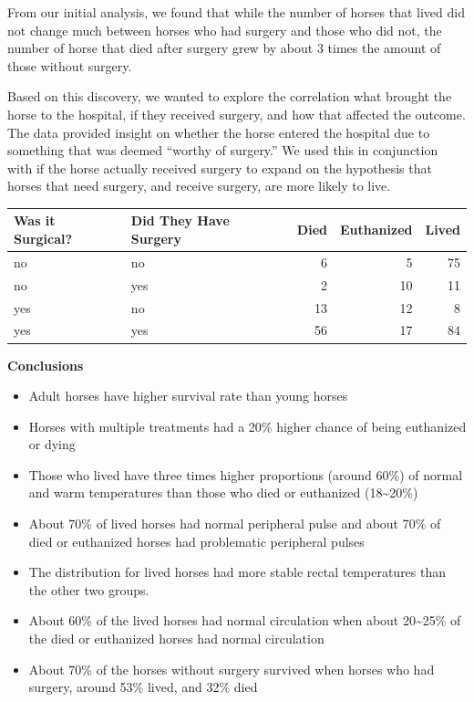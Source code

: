 \documentclass[
  12pt,
]{article}
\providecommand{\tightlist}{%
  \setlength{\itemsep}{0pt}\setlength{\parskip}{0pt}}
\begin{document}
From our initial analysis, we found that while the number of horses that
lived did not change much between horses who had surgery and those who
did not, the number of horse that died after surgery grew by about 3
times the amount of those without surgery.

Based on this discovery, we wanted to explore the correlation what
brought the horse to the hospital, if they received surgery, and how
that affected the outcome. The data provided insight on whether the
horse entered the hospital due to something that was deemed ``worthy of
surgery.'' We used this in conjunction with if the horse actually
received surgery to expand on the hypothesis that horses that need
surgery, and receive surgery, are more likely to live.

\begin{longtable}[]{@{}llrrr@{}}
\toprule
Was it Surgical? & Did They Have Surgery & Died & Euthanized &
Lived\tabularnewline
\midrule
\endhead
no & no & 6 & 5 & 75\tabularnewline
no & yes & 2 & 10 & 11\tabularnewline
yes & no & 13 & 12 & 8\tabularnewline
yes & yes & 56 & 17 & 84\tabularnewline
\bottomrule
\end{longtable}

\textbf{Conclusions}

\begin{itemize}
\tightlist
\item
  Adult horses have higher survival rate than young horses
\item
  Horses with multiple treatments had a 20\% higher chance of being
  euthanized or dying
\item
  Those who lived have three times higher proportions (around 60\%) of
  normal and warm temperatures than those who died or euthanized
  (18\textasciitilde20\%)
\item
  About 70\% of lived horses had normal peripheral pulse and about 70\%
  of died or euthanized horses had problematic peripheral pulses
\item
  The distribution for lived horses had more stable rectal temperatures
  than the other two groups.
\item
  About 60\% of the lived horses had normal circulation when about
  20\textasciitilde25\% of the died or euthanized horses had normal
  circulation
\item
  About 70\% of the horses without surgery survived when horses who had
  surgery, around 53\% lived, and 32\% died
\end{itemize}
\end{document}
